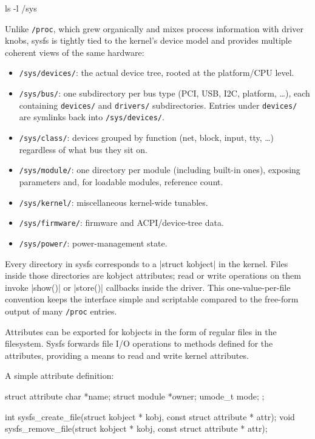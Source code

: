 \documentclass[10pt, oneside]{book}
\begin{document}
\begin{codebash}
ls -l /sys
\end{codebash}

Unlike \verb|/proc|, which grew organically and mixes process information with driver knobs, sysfs is tightly tied to the kernel's device model and provides multiple coherent views of the same hardware:

\begin{itemize}
  \item \verb|/sys/devices/|: the actual device tree, rooted at the platform/CPU level.
  \item \verb|/sys/bus/|: one subdirectory per bus type (PCI, USB, I2C, platform, \dots), each containing \verb|devices/| and \verb|drivers/| subdirectories. Entries under \verb|devices/| are symlinks back into \verb|/sys/devices/|.
  \item \verb|/sys/class/|: devices grouped by function (net, block, input, tty, \dots) regardless of what bus they sit on.
  \item \verb|/sys/module/|: one directory per module (including built-in ones), exposing parameters and, for loadable modules, reference count.
  \item \verb|/sys/kernel/|: miscellaneous kernel-wide tunables.
  \item \verb|/sys/firmware/|: firmware and ACPI/device-tree data.
  \item \verb|/sys/power/|: power-management state.
\end{itemize}

Every directory in sysfs corresponds to a \cpp|struct kobject| in the kernel.
Files inside those directories are kobject attributes; read or write operations on them invoke \cpp|show()| or \cpp|store()| callbacks inside the driver.
This one-value-per-file convention keeps the interface simple and scriptable compared to the free-form output of many \verb|/proc| entries.

Attributes can be exported for kobjects in the form of regular files in the filesystem.
Sysfs forwards file I/O operations to methods defined for the attributes, providing a means to read and write kernel attributes.

A simple attribute definition:

\begin{code}
struct attribute {
    char *name;
    struct module *owner;
    umode_t mode;
};

int sysfs_create_file(struct kobject * kobj, const struct attribute * attr);
void sysfs_remove_file(struct kobject * kobj, const struct attribute * attr);
\end{code}
\end{document}
